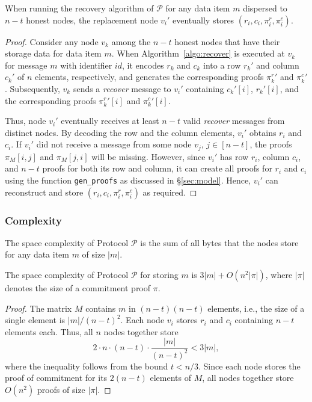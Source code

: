 \documentclass[sigconf,screen]{acmart}
\begin{document}
\begin{lemma}[Recovery] When running the recovery algorithm of $\mathcal{P}$ for any data item $m$ dispersed to $n-t$ honest nodes, the replacement node $v_i'$ eventually stores $(r_i,c_i,\pi_i^r,\pi_i^c)$.
\end{lemma}\label{lemma:recovery}
\begin{proof}
Consider any node $v_k$ among the $n-t$ honest nodes that have their storage data for data item $m$.
When Algorithm~\ref{algo:recover} is executed at $v_k$ for message $m$ with identifier $id$, it encodes $r_k$ and $c_k$ into a row $r_k'$ and column $c_k'$ of $n$ elements, respectively, and generates the corresponding proofs ${\pi_k^r}'$ and ${\pi_k^c}'$. Subsequently, $v_k$ sends a \emph{recover} message to $v_i'$ containing $c_k'[i]$, $r_k'[i]$, and the corresponding proofs ${\pi_k^r}'[i]$ and ${\pi_k^c}'[i]$.

Thus, node $v_i'$ eventually receives at least $n-t$ valid \emph{recover} messages from distinct nodes.
By decoding the row and the column elements, $v_i'$ obtains $r_i$ and $c_i$.
If $v_i'$ did not receive a message from some node $v_j$, $j\in[n-t]$, the proofs $\pi_M[i, j]$ and $\pi_M[j, i]$ will be missing. However, since $v_i'$ has row $r_i$, column $c_i$, and $n-t$ proofs for both its row and column, it can create all proofs for $r_i$ and $c_i$ using the function \texttt{gen\_proofs} as discussed in \S\ref{sec:model}.
Hence, $v_i'$ can reconstruct and store $(r_i, c_i, \pi_i^r, \pi_i^c)$ as required.
\end{proof}

\subsubsection{Complexity}

The space complexity of Protocol $\mathcal{P}$ is the sum of all bytes that the nodes store for any data item $m$ of size $|m|$.

\begin{theorem}
\label{theorem:space_complexity}
The space complexity of Protocol $\mathcal{P}$ for storing $m$ is $3|m| + O(n^2|\pi|)$, where $|\pi|$ denotes the size of a commitment proof $\pi$.
\end{theorem}
\begin{proof}
The matrix $M$ contains $m$ in $(n-t)(n-t)$ elements, i.e., the size of a single element is ${|m|}/{(n-t)^2}$.
Each node $v_i$ stores $r_i$ and $c_i$ containing $n-t$ elements each. Thus, all $n$ nodes together store $$2 \cdot n \cdot (n-t)\cdot \frac{|m|}{(n-t)^2} < 3|m|,$$ where the inequality follows from the bound $t < n/3$. Since each node stores the proof of commitment for its $2(n-t)$ elements of $M$, all nodes together store $O(n^2)$ proofs of size $|\pi|$.
\end{proof}
\end{document}
